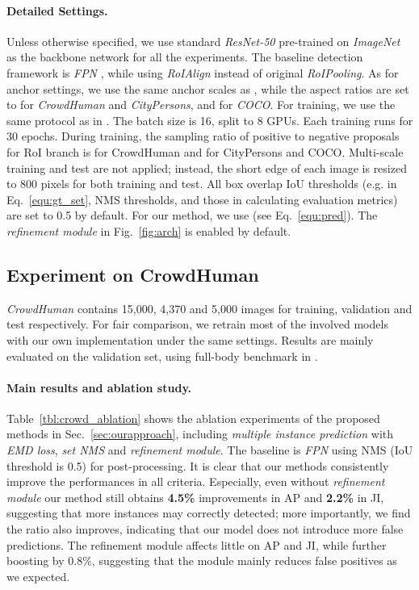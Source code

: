 \documentclass[10pt,twocolumn,letterpaper]{article}
\begin{document}
\paragraph{Detailed Settings. } 
\label{sec:detailed_setttings}
Unless otherwise specified, we use standard \emph{ResNet-50} \cite{he2016deep} pre-trained on \emph{ImageNet} \cite{russakovsky2015imagenet} as the backbone network for all the experiments. The baseline detection framework is \emph{FPN} \cite{lin2017feature}, while using \emph{RoIAlign} \cite{he2017mask} instead of original \emph{RoIPooling}. As for anchor settings, we use the same anchor scales as \cite{lin2017feature}, while the aspect ratios are set to  for \emph{CrowdHuman} and \emph{CityPersons}, and  for \emph{COCO}. For training, we use the same protocol as in \cite{lin2017feature}. The batch size is 16, split to 8 GPUs. Each training runs for 30 epochs. During training, the sampling ratio of positive to negative proposals for RoI branch is  for CrowdHuman and  for CityPersons and COCO. Multi-scale training and test are not applied; instead, the short edge of each image is resized to 800 pixels for both training and test.  All box overlap IoU thresholds (e.g.  in Eq.~\ref{equ:gt_set}, NMS thresholds, and those in calculating evaluation metrics) are set to 0.5 by default. For our method, we use  (see Eq.~\ref{equ:pred}). The \emph{refinement module} in Fig.~\ref{fig:arch} is enabled by default. 






\subsection{Experiment on CrowdHuman}

\emph{CrowdHuman} \cite{shao2018crowdhuman} contains 15,000, 4,370 and 5,000 images for training, validation and test respectively. For fair comparison, we retrain most of the involved models with our own implementation under the same settings. Results are mainly evaluated on the validation set, using full-body benchmark in \cite{shao2018crowdhuman}. 

\paragraph{Main results and ablation study.} Table~\ref{tbl:crowd_ablation} shows the ablation experiments of the proposed methods in Sec.~\ref{sec:ourapproach}, including \emph{multiple instance prediction} with \emph{EMD loss}, \emph{set NMS} and \emph{refinement module}. The baseline is \emph{FPN} \cite{lin2017feature} using NMS (IoU threshold is 0.5) for post-processing. It is clear that our methods consistently improve the performances in all criteria. Especially, even without \emph{refinement module} our method still obtains \textbf{4.5\%} improvements in AP and \textbf{2.2\%} in JI, suggesting that more instances may correctly detected; more importantly, we find the  ratio also improves, indicating that our model does not introduce more false predictions. The refinement module affects little on AP and JI, while further boosting   by 0.8\%, suggesting that the module mainly reduces false positives as we expected. 
\end{document}
